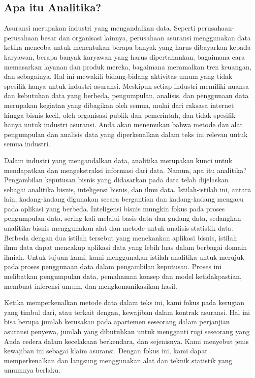 \documentclass[
]{book}
\begin{document}
\hypertarget{apa-itu-analitika}{%
\subsection{Apa itu Analitika?}\label{apa-itu-analitika}}

Asuransi merupakan industri yang mengandalkan data. Seperti perusahaan-perusahaan besar dan organisasi lainnya, perusahaan asuransi menggunakan data ketika mencoba untuk menentukan berapa banyak yang harus dibayarkan kepada karyawan, berapa banyak karyawan yang harus dipertahankan, bagaimana cara memasarkan layanan dan produk mereka, bagaimana meramalkan tren keuangan, dan sebagainya. Hal ini mewakili bidang-bidang aktivitas umum yang tidak spesifik hanya untuk industri asuransi. Meskipun setiap industri memiliki nuansa dan kebutuhan data yang berbeda, pengumpulan, analisis, dan penggunaan data merupakan kegiatan yang dibagikan oleh semua, mulai dari raksasa internet hingga bisnis kecil, oleh organisasi publik dan pemerintah, dan tidak spesifik hanya untuk industri asuransi. Anda akan menemukan bahwa metode dan alat pengumpulan dan analisis data yang diperkenalkan dalam teks ini relevan untuk semua industri.

Dalam industri yang mengandalkan data, analitika merupakan kunci untuk mendapatkan dan mengekstraksi informasi dari data. Namun, apa itu analitika? Pengambilan keputusan bisnis yang didasarkan pada data telah dijelaskan sebagai analitika bisnis, inteligensi bisnis, dan ilmu data. Istilah-istilah ini, antara lain, kadang-kadang digunakan secara bergantian dan kadang-kadang mengacu pada aplikasi yang berbeda. Inteligensi bisnis mungkin fokus pada proses pengumpulan data, sering kali melalui basis data dan gudang data, sedangkan analitika bisnis menggunakan alat dan metode untuk analisis statistik data. Berbeda dengan dua istilah tersebut yang menekankan aplikasi bisnis, istilah ilmu data dapat mencakup aplikasi data yang lebih luas dalam berbagai domain ilmiah. Untuk tujuan kami, kami menggunakan istilah analitika untuk merujuk pada proses penggunaan data dalam pengambilan keputusan. Proses ini melibatkan pengumpulan data, pemahaman konsep dan model ketidakpastian, membuat inferensi umum, dan mengkomunikasikan hasil.

Ketika memperkenalkan metode data dalam teks ini, kami fokus pada kerugian yang timbul dari, atau terkait dengan, kewajiban dalam kontrak asuransi. Hal ini bisa berupa jumlah kerusakan pada apartemen seseorang dalam perjanjian asuransi penyewa, jumlah yang dibutuhkan untuk mengganti rugi seseorang yang Anda cedera dalam kecelakaan berkendara, dan sejenisnya. Kami menyebut jenis kewajiban ini sebagai klaim asuransi. Dengan fokus ini, kami dapat memperkenalkan dan langsung menggunakan alat dan teknik statistik yang umumnya berlaku.
\end{document}
